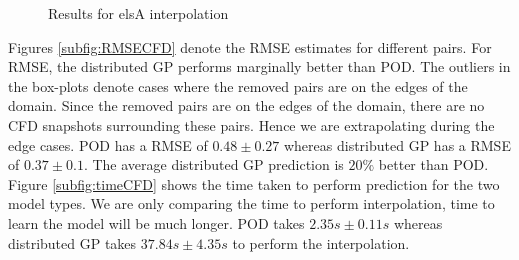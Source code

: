 \begin{figure}[!ht]
  \centering
  \quad
  \caption{Results for elsA interpolation}
\end{figure}

Figures \ref{subfig:RMSECFD} denote the RMSE estimates for different pairs. For RMSE, the distributed GP performs marginally better than POD. The outliers in the box-plots denote cases where the removed pairs are on the edges of the domain. Since the removed pairs are on the edges of the domain, there are no CFD snapshots surrounding these pairs. Hence we are extrapolating during the edge cases. POD has a RMSE of $0.48\pm0.27$ whereas distributed GP has a RMSE of $0.37\pm0.1$. The average distributed GP prediction is $20\%$ better than POD. Figure \ref{subfig:timeCFD} shows the time taken to perform prediction for the two model types. We are only comparing the time to perform interpolation, time to learn the model will be much longer. POD takes $2.35s\pm0.11s$ whereas distributed GP takes $37.84s\pm4.35s$ to perform the interpolation.  

